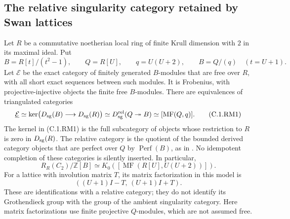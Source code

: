 \subsection{The relative singularity category retained by Swan lattices}

\begin{lemma}
\label{C:relative-Swan-MF-bridge}
Let $R$ be a commutative noetherian local ring of finite
Krull dimension with $2$ in its maximal ideal.
Put
\[
 B=R[t]/(t^2-1),\qquad Q=R[U],\qquad q=U(U+2),
 \qquad B=Q/(q)\quad(t=U+1).
\]
Let $\mathcal E$ be the exact category of finitely
generated $B$-modules that are free over $R$, with
all short exact sequences between such modules.
It is Frobenius, with projective-injective objects
the finite free $B$-modules.
There are equivalences of triangulated categories
\[
 \underline{\mathcal E}
 \simeq
 \ker\bigl(D_{\rm sg}(B)\longrightarrow D_{\rm sg}(R)\bigr)
 \simeq
 D_{\rm sg}^{\rm rel}(Q\twoheadrightarrow B)
 \simeq [\operatorname{MF}(Q,q)].                    \tag{C.1.RM1}
\]
The kernel in (C.1.RM1) is the full subcategory of
objects whose restriction to $R$ is zero in
$D_{\rm sg}(R)$.
The relative category is the quotient of the bounded
derived category objects that are perfect over $Q$
by $\operatorname{Perf}(B)$, as in
\cite[Definition 2.6]{C-BurkeWalker2012}.
No idempotent completion of these categories is
silently inserted.
In particular,
\[
 R_R(C_2)/\mathbb Z[B]
            \simeq K_0([\operatorname{MF}(R[U],U(U+2))]).
                                                               \tag{C.1.RM2}
\]
For a lattice with involution matrix $T$, its
matrix factorization in this model is
\[
          ((U+1)I-T,\ (U+1)I+T).                    \tag{C.1.RM3}
\]
These are identifications with a relative category;
they do not identify its Grothendieck group with
the group of the ambient singularity category.
Here matrix factorizations use finite projective
$Q$-modules, which are not assumed free.
\end{lemma}
